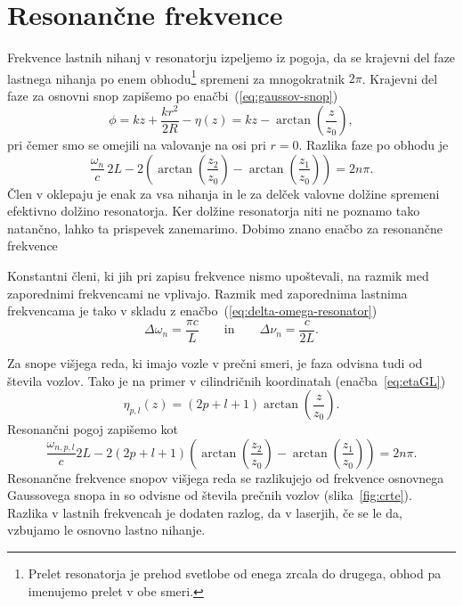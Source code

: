 \section{Resonančne frekvence}
Frekvence
lastnih nihanj v resonatorju izpeljemo iz pogoja, 
da se krajevni del faze lastnega nihanja po enem 
obhodu\footnote{Prelet resonatorja je prehod svetlobe od enega zrcala
do drugega, obhod pa imenujemo prelet v obe smeri.}
spremeni za mnogokratnik $2\pi$. Krajevni del faze za osnovni snop 
zapišemo po enačbi~(\ref{eq:gaussov-snop})
\begin{equation}
\phi = kz+\frac{kr^{2}}{2R} -\eta(z) = kz-\arctan \left(\frac{z}{z_{0}}\right),
\label{eq:fazag}
\end{equation}
pri čemer  smo se omejili na valovanje na osi pri $r=0$. 
Razlika faze po obhodu je 
\begin{equation}
\frac{\omega_{n}}{c}\,2L-2\left(\arctan \left(\frac{z_{2}}{z_{0}}\right)-
\arctan\left(\frac{z_{1}}{z_{0}}\right)\right)=2n\pi.
\label{eq:fazan}
\end{equation}
Člen v oklepaju je enak za vsa nihanja in le za delček valovne dolžine 
spremeni efektivno dolžino resonatorja. Ker dolžine resonatorja niti ne poznamo
tako natančno, lahko ta prispevek zanemarimo. Dobimo znano enačbo za resonančne frekvence 

Konstantni členi, ki jih pri zapisu frekvence nismo upoštevali, na razmik med
zaporednimi frekvencami ne vplivajo. Razmik med zaporednima
lastnima frekvencama je tako v skladu z enačbo~(\ref{eq:delta-omega-resonator})
\begin{equation}
\Delta\omega_n=\frac{\pi c}{L} \qquad \mathrm{in}\qquad \Delta \nu_n=\frac{c}{2L}.
\label{eq:deltaomega}
\end{equation}

Za snope višjega reda, ki imajo vozle v prečni smeri, je faza
odvisna tudi od števila vozlov. Tako je na primer v cilindričnih koordinatah
(enačba~\ref{eq:etaGL})
\begin{equation}
\eta_{p,l}(z)=(2p+l+1)\arctan\left(\frac{z}{z_{0}}\right).
\end{equation}
Resonančni pogoj zapišemo kot
\begin{equation}
\frac{\omega_{n,p,l}}{c}2L-2(2p+l+1)\left(\arctan\left(\frac{z_{2}}{z_{0}}\right)-
\arctan\left(\frac{z_{1}}{z_{0}}\right)\right)=2n\pi.
\end{equation}
Resonančne frekvence snopov višjega reda se razlikujejo od frekvence osnovnega 
Gaussovega snopa in so odvisne od števila prečnih vozlov (slika~\ref{fig:crte}).
Razlika v lastnih frekvencah je dodaten razlog, da v laserjih, če se le da, 
vzbujamo le osnovno lastno nihanje.

